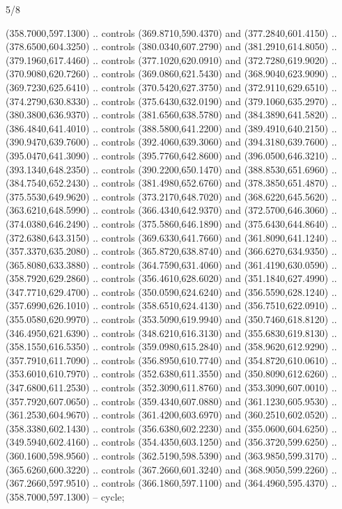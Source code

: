 \begin{flagdescription}{5/8}
\begin{scope}[shift={(m)}]
\begin{scope}[scale=\flagwidth/220,y=0.1mm, x=0.1mm, yscale=-1,shift={(-596,-360)}]
\begin{scope}[draw=black,line join=round,line cap=round,line width=0.381\lw]
\begin{scope}[line width=0.534\lw,fill=green]
 (358.7000,597.1300) .. controls (369.8710,590.4370) and
  (377.2840,601.4150) .. (378.6500,604.3250) .. controls (380.0340,607.2790) and
  (381.2910,614.8050) .. (379.1960,617.4460) .. controls (377.1020,620.0910) and
  (372.7280,619.9020) .. (370.9080,620.7260) .. controls (369.0860,621.5430) and
  (368.9040,623.9090) .. (369.7230,625.6410) .. controls (370.5420,627.3750) and
  (372.9110,629.6510) .. (374.2790,630.8330) .. controls (375.6430,632.0190) and
  (379.1060,635.2970) .. (380.3800,636.9370) .. controls (381.6560,638.5780) and
  (384.3890,641.5820) .. (386.4840,641.4010) .. controls (388.5800,641.2200) and
  (389.4910,640.2150) .. (390.9470,639.7600) .. controls (392.4060,639.3060) and
  (394.3180,639.7600) .. (395.0470,641.3090) .. controls (395.7760,642.8600) and
  (396.0500,646.3210) .. (393.1340,648.2350) .. controls (390.2200,650.1470) and
  (388.8530,651.6960) .. (384.7540,652.2430) .. controls (381.4980,652.6760) and
  (378.3850,651.4870) .. (375.5530,649.9620) .. controls (373.2170,648.7020) and
  (368.6220,645.5620) .. (363.6210,648.5990) .. controls (366.4340,642.9370) and
  (372.5700,646.3060) .. (374.0380,646.2490) .. controls (375.5860,646.1890) and
  (375.6430,644.8640) .. (372.6380,643.3150) .. controls (369.6330,641.7660) and
  (361.8090,641.1240) .. (357.3370,635.2080) .. controls (365.8720,638.8740) and
  (366.6270,634.9350) .. (365.8080,633.3880) .. controls (364.7590,631.4060) and
  (361.4190,630.0590) .. (358.7920,629.2860) .. controls (356.4610,628.6020) and
  (351.1840,627.4990) .. (347.7710,629.4700) .. controls (350.0590,624.6240) and
  (356.5590,628.1240) .. (357.6990,626.1010) .. controls (358.6510,624.4130) and
  (356.7510,622.0910) .. (355.0580,620.9970) .. controls (353.5090,619.9940) and
  (350.7460,618.8120) .. (346.4950,621.6390) .. controls (348.6210,616.3130) and
  (355.6830,619.8130) .. (358.1550,616.5350) .. controls (359.0980,615.2840) and
  (358.9620,612.9290) .. (357.7910,611.7090) .. controls (356.8950,610.7740) and
  (354.8720,610.0610) .. (353.6010,610.7970) .. controls (352.6380,611.3550) and
  (350.8090,612.6260) .. (347.6800,611.2530) .. controls (352.3090,611.8760) and
  (353.3090,607.0010) .. (357.7920,607.0650) .. controls (359.4340,607.0880) and
  (361.1230,605.9530) .. (361.2530,604.9670) .. controls (361.4200,603.6970) and
  (360.2510,602.0520) .. (358.3380,602.1430) .. controls (356.6380,602.2230) and
  (355.0600,604.6250) .. (349.5940,602.4160) .. controls (354.4350,603.1250) and
  (356.3720,599.6250) .. (360.1600,598.9560) .. controls (362.5190,598.5390) and
  (363.9850,599.3170) .. (365.6260,600.3220) .. controls (367.2660,601.3240) and
  (368.9050,599.2260) .. (367.2660,597.9510) .. controls (366.1860,597.1100) and
  (364.4960,595.4370) .. (358.7000,597.1300) -- cycle;


\end{scope}
\end{scope}
\end{scope}
\end{scope}
\end{flagdescription}
